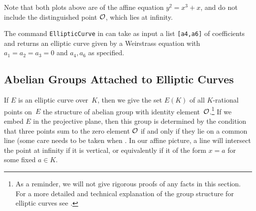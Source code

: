Note that both plots above are of the affine equation $y^2 = x^3 + x$,
and do not include the distinguished point $\mathcal{O}$, which lies at
infinity.

\begin{remark}
The command {\tt{EllipticCurve}} in \Sage
can take as input a list {\tt{[a4,a6]}}
of coefficients and returns an elliptic curve given
by a Weirstrass equation with $a_1=a_2=a_3=0$ and
$a_4,a_6$ as specified.
\end{remark}

\subsection{Abelian Groups Attached to Elliptic Curves}
If $E$ is an elliptic curve over~$K$, then we give the set
$E(K)$ of all $K$-rational points on~$E$ the structure of abelian
group with identity element~$\mathcal{O}$.\footnote{
As a reminder, we will not give rigorous proofs of any facts in
this section. For a more detailed and technical explanation of
the group structure for elliptic curves
see \cite[Ch.~III.2]{silverman:aec}.
}
If we embed $E$ in the projective
plane, then this group is determined by the condition that three
points sum to the zero element $\mathcal{O}$ if and only if they lie on a
common line (some care needs to be taken when .
In our affine picture, a line will intersect the point at infinity
if it is vertical, or equivalently if it of the form $x=a$ for
some fixed $a\in K$.



